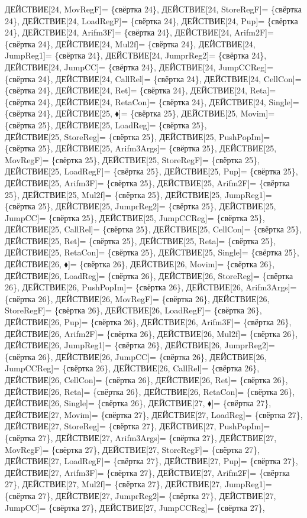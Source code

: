 \documentclass[a0]{a0poster}
\begin{document}
ДЕЙСТВИЕ[24, MovRegF]= \{свёртка 24\}, ДЕЙСТВИЕ[24, StoreRegF]= \{свёртка 24\}, ДЕЙСТВИЕ[24, LoadRegF]= \{свёртка 24\}, ДЕЙСТВИЕ[24, Pup]= \{свёртка 24\}, ДЕЙСТВИЕ[24, Arifm3F]= \{свёртка 24\}, ДЕЙСТВИЕ[24, Arifm2F]= \{свёртка 24\}, ДЕЙСТВИЕ[24, Mul2f]= \{свёртка 24\}, ДЕЙСТВИЕ[24, JumpReg1]= \{свёртка 24\}, ДЕЙСТВИЕ[24, JumprReg2]= \{свёртка 24\}, ДЕЙСТВИЕ[24, JumpCC]= \{свёртка 24\}, ДЕЙСТВИЕ[24, JumpCCReg]= \{свёртка 24\}, ДЕЙСТВИЕ[24, CallRel]= \{свёртка 24\}, ДЕЙСТВИЕ[24, CellCon]= \{свёртка 24\}, ДЕЙСТВИЕ[24, Ret]= \{свёртка 24\}, ДЕЙСТВИЕ[24, Reta]= \{свёртка 24\}, ДЕЙСТВИЕ[24, RetaCon]= \{свёртка 24\}, ДЕЙСТВИЕ[24, Single]= \{свёртка 24\}, ДЕЙСТВИЕ[25, $\blacklozenge$]= \{свёртка 25\}, ДЕЙСТВИЕ[25, Movim]= \{свёртка 25\}, ДЕЙСТВИЕ[25, LoadReg]= \{свёртка 25\}, \\
ДЕЙСТВИЕ[25, StoreReg]= \{свёртка 25\}, ДЕЙСТВИЕ[25, PushPopIm]= \{свёртка 25\}, ДЕЙСТВИЕ[25, Arifm3Args]= \{свёртка 25\}, ДЕЙСТВИЕ[25, MovRegF]= \{свёртка 25\}, ДЕЙСТВИЕ[25, StoreRegF]= \{свёртка 25\}, ДЕЙСТВИЕ[25, LoadRegF]= \{свёртка 25\}, ДЕЙСТВИЕ[25, Pup]= \{свёртка 25\}, ДЕЙСТВИЕ[25, Arifm3F]= \{свёртка 25\}, ДЕЙСТВИЕ[25, Arifm2F]= \{свёртка 25\}, ДЕЙСТВИЕ[25, Mul2f]= \{свёртка 25\}, ДЕЙСТВИЕ[25, JumpReg1]= \{свёртка 25\}, ДЕЙСТВИЕ[25, JumprReg2]= \{свёртка 25\}, ДЕЙСТВИЕ[25, JumpCC]= \{свёртка 25\}, ДЕЙСТВИЕ[25, JumpCCReg]= \{свёртка 25\}, ДЕЙСТВИЕ[25, CallRel]= \{свёртка 25\}, ДЕЙСТВИЕ[25, CellCon]= \{свёртка 25\}, ДЕЙСТВИЕ[25, Ret]= \{свёртка 25\}, ДЕЙСТВИЕ[25, Reta]= \{свёртка 25\}, ДЕЙСТВИЕ[25, RetaCon]= \{свёртка 25\}, ДЕЙСТВИЕ[25, Single]= \{свёртка 25\}, \\
ДЕЙСТВИЕ[26, $\blacklozenge$]= \{свёртка 26\}, ДЕЙСТВИЕ[26, Movim]= \{свёртка 26\}, ДЕЙСТВИЕ[26, LoadReg]= \{свёртка 26\}, ДЕЙСТВИЕ[26, StoreReg]= \{свёртка 26\}, ДЕЙСТВИЕ[26, PushPopIm]= \{свёртка 26\}, ДЕЙСТВИЕ[26, Arifm3Args]= \{свёртка 26\}, ДЕЙСТВИЕ[26, MovRegF]= \{свёртка 26\}, ДЕЙСТВИЕ[26, StoreRegF]= \{свёртка 26\}, ДЕЙСТВИЕ[26, LoadRegF]= \{свёртка 26\}, ДЕЙСТВИЕ[26, Pup]= \{свёртка 26\}, ДЕЙСТВИЕ[26, Arifm3F]= \{свёртка 26\}, ДЕЙСТВИЕ[26, Arifm2F]= \{свёртка 26\}, ДЕЙСТВИЕ[26, Mul2f]= \{свёртка 26\}, ДЕЙСТВИЕ[26, JumpReg1]= \{свёртка 26\}, ДЕЙСТВИЕ[26, JumprReg2]= \{свёртка 26\}, ДЕЙСТВИЕ[26, JumpCC]= \{свёртка 26\}, ДЕЙСТВИЕ[26, JumpCCReg]= \{свёртка 26\}, ДЕЙСТВИЕ[26, CallRel]= \{свёртка 26\}, ДЕЙСТВИЕ[26, CellCon]= \{свёртка 26\}, ДЕЙСТВИЕ[26, Ret]= \{свёртка 26\}, \\
ДЕЙСТВИЕ[26, Reta]= \{свёртка 26\}, ДЕЙСТВИЕ[26, RetaCon]= \{свёртка 26\}, ДЕЙСТВИЕ[26, Single]= \{свёртка 26\}, ДЕЙСТВИЕ[27, $\blacklozenge$]= \{свёртка 27\}, ДЕЙСТВИЕ[27, Movim]= \{свёртка 27\}, ДЕЙСТВИЕ[27, LoadReg]= \{свёртка 27\}, ДЕЙСТВИЕ[27, StoreReg]= \{свёртка 27\}, ДЕЙСТВИЕ[27, PushPopIm]= \{свёртка 27\}, ДЕЙСТВИЕ[27, Arifm3Args]= \{свёртка 27\}, ДЕЙСТВИЕ[27, MovRegF]= \{свёртка 27\}, ДЕЙСТВИЕ[27, StoreRegF]= \{свёртка 27\}, ДЕЙСТВИЕ[27, LoadRegF]= \{свёртка 27\}, ДЕЙСТВИЕ[27, Pup]= \{свёртка 27\}, ДЕЙСТВИЕ[27, Arifm3F]= \{свёртка 27\}, ДЕЙСТВИЕ[27, Arifm2F]= \{свёртка 27\}, ДЕЙСТВИЕ[27, Mul2f]= \{свёртка 27\}, ДЕЙСТВИЕ[27, JumpReg1]= \{свёртка 27\}, ДЕЙСТВИЕ[27, JumprReg2]= \{свёртка 27\}, ДЕЙСТВИЕ[27, JumpCC]= \{свёртка 27\}, ДЕЙСТВИЕ[27, JumpCCReg]= \{свёртка 27\}, \\
\end{document}
